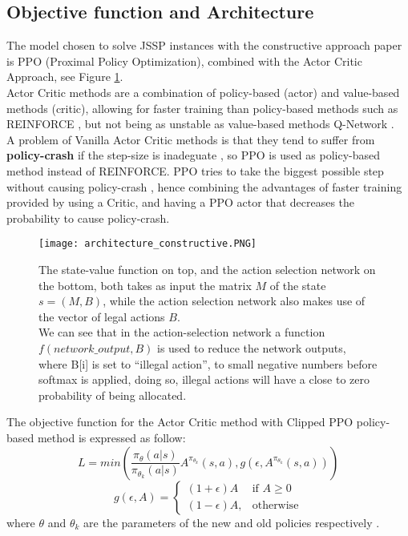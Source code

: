 \documentclass[12pt]{article}
\begin{document}
\subsection{Objective function and Architecture}
\label{subsection:model_constructive}
The model chosen to solve JSSP instances with the constructive approach paper is PPO (Proximal Policy Optimization), combined with the Actor Critic Approach, see Figure \ref{img:architecture_constructive}.\\
Actor Critic methods are a combination of policy-based (actor) and value-based methods (critic), allowing for faster training than policy-based methods such as REINFORCE \cite{rl_introduction}, but not being as unstable as value-based methods Q-Network \cite{rl_introduction}.\\
A problem of Vanilla Actor Critic methods is that they tend to suffer from \textbf{policy-crash} if the step-size is inadeguate \cite{pierre_constructive_approach}, 
so PPO is used as policy-based method instead of REINFORCE. PPO tries to take the biggest possible step without causing policy-crash \cite{pierre_constructive_approach},
 hence combining the advantages of faster training provided by using a Critic, and having a PPO actor that decreases the probability to cause policy-crash.

 \begin{figure}[H]
    \centering
    \texttt{[image: architecture\_constructive.PNG]}
    \caption{The state-value function on top, and the action selection network on the bottom, both takes as input the matrix $M$ of the state $s=(M,B)$, while the action selection network also makes use of the vector of legal actions $B$.\\ We can see that in the action-selection network a function $f(network\_output,B)$ is used to reduce the network outputs, where B[i] is set to ``illegal action'', to small negative numbers before softmax is applied, doing so, illegal actions will have a close to zero probability of being allocated.}
    \label{img:architecture_constructive}
\end{figure}

\medbreak
The objective function for the Actor Critic method with Clipped PPO policy-based method is expressed as follow: 
\label{constructive_loss}
$$L=min\left(\frac{\pi_{\theta}(a|s)}{\pi_{\theta_k}(a|s)}A^{\pi_{\theta_k}}(s,a), g(\epsilon, A^{\pi_{\theta_k}}(s,a))\right)$$
$$g(\epsilon,A)= 
\begin{cases}
    (1+\epsilon)A               & \text{if } A\geq 0\\
    (1-\epsilon)A,              & \text{otherwise}
\end{cases}
$$
where $\theta$ and $\theta_k$ are the parameters of the new and old policies respectively \cite{pierre_constructive_approach}.
\end{document}
